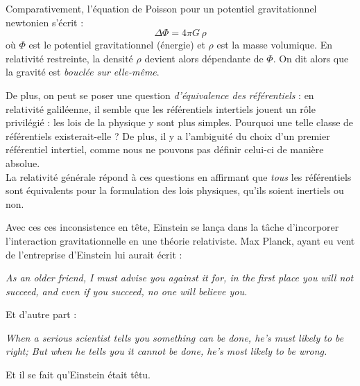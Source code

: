\begin{enumerate}
    Comparativement, l'équation de Poisson pour un potentiel gravitationnel newtonien s'écrit : 
    \begin{equation}
        \Delta \Phi = 4\pi G \,\rho
    \end{equation}
    où $\Phi$ est le potentiel gravitationnel (énergie) et $\rho$ est la masse volumique. En relativité restreinte, la densité $\rho$ devient alors dépendante de $\Phi$. On dit alors que la gravité est \emph{bouclée sur elle-même}. \\
 \end{enumerate}
 De plus, on peut se poser une question \emph{d'équivalence des référentiels} : en relativité galiléenne, il semble que les référentiels intertiels jouent un rôle privilégié : les lois de la physique y sont plus simples. Pourquoi une telle classe de référentiels existerait-elle ? De plus, il y a l'ambiguité du choix d'un premier référentiel intertiel, comme nous ne pouvons pas définir celui-ci de manière absolue. \\
 La relativité générale répond à ces questions en affirmant que \emph{tous} les référentiels sont équivalents pour la formulation des lois physiques, qu'ils soient inertiels ou non.

Avec ces ces inconsistence en tête, Einstein se lança dans la tâche d'incorporer l'interaction gravitationnelle en une théorie relativiste. Max Planck, ayant eu vent de l'entreprise d'Einstein lui aurait écrit :
\begin{center}
    \textit{As an older friend, I must advise you against it for, in the first place you will not succeed, and even if you succeed, no one will believe you.}
\end{center}
Et d'autre part :
\begin{center}
    \textit{When a serious scientist tells you something can be done, he's must likely to be right; But when he tells you it cannot be done, he's most likely to be wrong.}
\end{center}
Et il se fait qu'Einstein était têtu.
